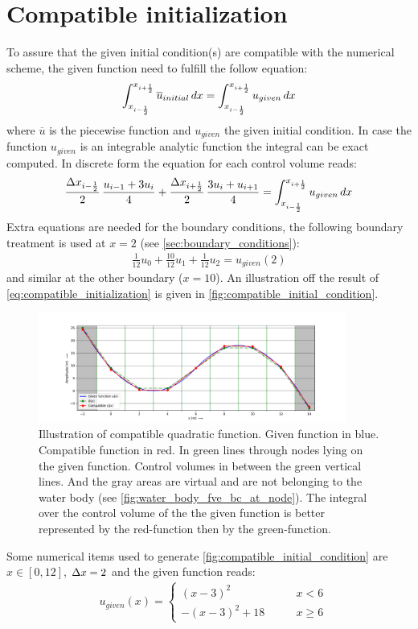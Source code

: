 \section{Compatible initialization}
To assure that the given initial condition(s) are compatible with the numerical scheme, the given function need to fulfill the follow equation:
\begin{align}
    \int_{x_{i-\frac{1}{2}}}^{x_{i+\frac{1}{2}}} \overline u_{initial}\, dx = \int_{x_{i-\frac{1}{2}}}^{x_{i+\frac{1}{2}}} u_{given}\, dx \label{eq:compatible_initialization}
\end{align}
where $\overline{u}$ is the piecewise function and $u_{given}$ the given initial condition.
In case the function $u_{given}$ is an integrable analytic function the integral can be exact computed.
In discrete form the equation for each control volume reads:
\begin{align}
    \frac{\Delta x_{i-\frac{1}{2}}}{2}\,\frac{u_{i-1} + 3 u_i}{4} +
    \frac{\Delta x_{i+\frac{1}{2}}}{2}\,\frac{3 u_i + u_{i+1}}{4} = \int_{x_{i-\frac{1}{2}}}^{x_{i+\frac{1}{2}}} u_{given}\, dx
\end{align}
Extra equations are needed for the boundary conditions, the following boundary treatment is used at $x=2$ (see  \autoref{sec:boundary_conditions}):
\begin{align}
	\frac{1}{12} u_0 + \frac{10}{12}u_1 + \frac{1}{12} u_2 = u_{given}(2)
\end{align}
and similar at the other boundary ($x=10$).
An illustration off the result of \autoref{eq:compatible_initialization} is given in \autoref{fig:compatible_initial_condition}.
\begin{figure}[H]
    \centering
    \includegraphics[width=0.9\textwidth]{figures/compatible_initialization_lx=12.0_dx=2.0.pdf}
    \caption[Illustration of compatible quadratic function]{Illustration of compatible quadratic function. Given function in blue. Compatible function in red. In green lines through nodes lying on the given function. Control volumes in between the green vertical lines. And the gray areas are virtual and are not belonging to the water body (see \autoref{fig:water_body_fve_bc_at_node}). The integral over the control volume of the the given function is better represented by the red-function then by the green-function. }\label{fig:compatible_initial_condition}
\end{figure}
Some numerical items used to generate \autoref{fig:compatible_initial_condition} are $x \in [0, 12]$, $\Delta x=2$ and the given function reads:
\begin{align}
	&u_{given}(x) =
	\begin{cases}
		(x-3)^2 & \qquad x < 6
		\\ 
		-(x-3)^2 + 18 & \qquad x \geq 6
	\end{cases}
\end{align}